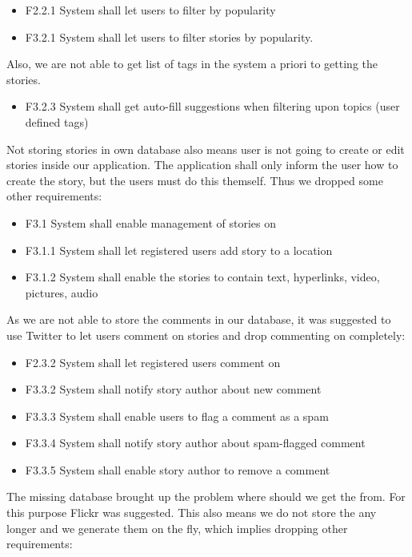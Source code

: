 \documentclass[11pt]{book}
\begin{document}
\begin{itemize}
  \item F2.2.1 System shall let users to filter \wallentityp by popularity
  \item F3.2.1 System shall let users to filter stories by popularity.
\end{itemize}

Also, we are not able to get list of tags in the system a priori to
getting the stories.

\begin{itemize}
  \item F3.2.3 System shall get auto-fill suggestions when filtering upon
  topics (user defined tags)
\end{itemize}

Not storing stories in own database also means user is not going to
create or edit stories inside our application. The application shall
only inform the user how to create the story, but the users must do this
themself. Thus we dropped some other requirements:

\begin{itemize}
  \item F3.1 System shall enable management of stories on \wallentityp
  \item F3.1.1 System shall let registered users add story to a location
  \item F3.1.2 System shall enable the stories to contain text, hyperlinks,
  video, pictures, audio
\end{itemize}

As we are not able to store the comments in our database, it was
suggested to use Twitter to let users comment on stories and drop
commenting on \wallentityp completely:

\begin{itemize}
  \item F2.3.2 System shall let registered users comment on \wallentityp
  \item F3.3.2 System shall notify story author about new comment
  \item F3.3.3 System shall enable users to flag a comment as a spam
  \item F3.3.4 System shall notify story author about spam-flagged comment
  \item F3.3.5 System shall enable story author to remove a comment
\end{itemize}

The missing database brought up the problem where should we get the
\wallentityp from. For this purpose Flickr was suggested. This also
means we do not store the \wallentityp any longer and we generate them on the fly,
which implies dropping other requirements:
\end{document}

